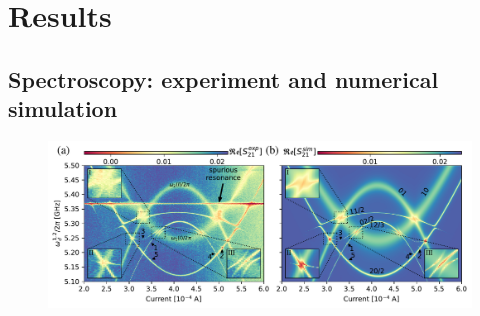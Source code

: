\documentclass[%
 pra,
 amsmath,amssymb,
 reprint,%
]{revtex4-1}
\begin{document}
\section{Results}

\subsection{\label{sec:level1} Spectroscopy: experiment and numerical simulation}

\begin{figure}
	
	\centering
	\includegraphics[width=\linewidth]{main_picture}
	

\end{figure}
\end{document}
